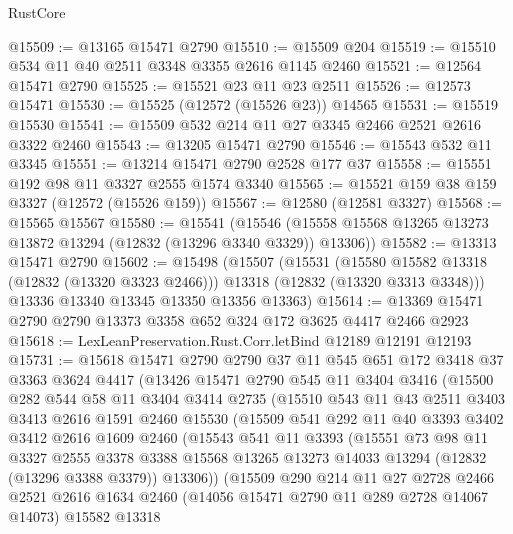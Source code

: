 \begin{lexlean}{RustCore}
\begin{coremodule}
@15509 := @13165 @15471 @2790
@15510 := @15509 @204
@15519 := @15510 @534 @11 @40 @2511 @3348 @3355 @2616 @1145 @2460
@15521 := @12564 @15471 @2790
@15525 := @15521 @23 @11 @23 @2511
@15526 := @12573 @15471
@15530 := @15525 (@12572 (@15526 @23)) @14565
@15531 := @15519 @15530
@15541 := @15509 @532 @214 @11 @27 @3345 @2466 @2521 @2616 @3322 @2460
@15543 := @13205 @15471 @2790
@15546 := @15543 @532 @11 @3345
@15551 := @13214 @15471 @2790 @2528 @177 @37
@15558 := @15551 @192 @98 @11 @3327 @2555 @1574 @3340
@15565 := @15521 @159 @38 @159 @3327 (@12572 (@15526 @159))
@15567 := @12580 (@12581 @3327)
@15568 := @15565 @15567
@15580 := @15541
    (@15546 (@15558 @15568 @13265 @13273 @13872 @13294 (@12832 (@13296 @3340 @3329)) @13306))
@15582 := @13313 @15471 @2790
@15602 := @15498
    (@15507
      (@15531
        (@15580 @15582 @13318 (@12832 (@13320 @3323 @2466)))
        @13318
        (@12832 (@13320 @3313 @3348)))
      @13336
      @13340
      @13345
      @13350
      @13356
      @13363)
@15614 := @13369 @15471 @2790 @2790 @13373 @3358 @652 @324 @172 @3625 @4417 @2466 @2923
@15618 := LexLeanPreservation.Rust.Corr.letBind @12189 @12191 @12193
@15731 := @15618
    @15471
    @2790
    @2790
    @37
    @11
    @545
    @651
    @172
    @3418
    @37
    @3363
    @3624
    @4417
    (@13426
      @15471
      @2790
      @545
      @11
      @3404
      @3416
      (@15500
        @282
        @544
        @58
        @11
        @3404
        @3414
        @2735
        (@15510
          @543
          @11
          @43
          @2511
          @3403
          @3413
          @2616
          @1591
          @2460
          @15530
          (@15509
            @541
            @292
            @11
            @40
            @3393
            @3402
            @3412
            @2616
            @1609
            @2460
            (@15543
              @541
              @11
              @3393
              (@15551
                @73
                @98
                @11
                @3327
                @2555
                @3378
                @3388
                @15568
                @13265
                @13273
                @14033
                @13294
                (@12832 (@13296 @3388 @3379))
                @13306))
            (@15509
              @290
              @214
              @11
              @27
              @2728
              @2466
              @2521
              @2616
              @1634
              @2460
              (@14056 @15471 @2790 @11 @289 @2728 @14067 @14073)
              @15582
              @13318

\end{coremodule}
\end{lexlean}
